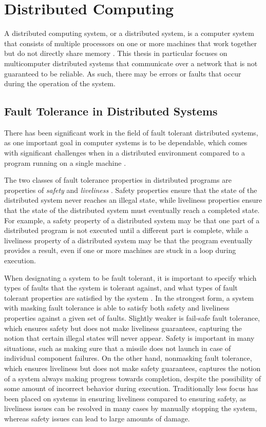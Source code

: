 \documentclass[twoside]{report}
\begin{document}
\section{Distributed Computing}

A distributed computing system, or a distributed system, is a computer system that consists of multiple processors on one or more machines that work together but do not directly share memory \cite{10.1145/72551.72552}.
This thesis in particular focuses on multicomputer distributed systems that communicate over a network that is not guaranteed to be reliable.
As such, there may be errors or faults that occur during the operation of the system.

\subsection{Fault Tolerance in Distributed Systems}
There has been significant work in the field of fault tolerant distributed systems, as one important goal in computer systems is to be dependable, which comes with significant challenges when in a distributed environment compared to a program running on a single machine \cite{10.1145/311531.311532}.

The two classes of fault tolerance properties in distributed programs are properties of \textit{safety} and \textit{liveliness} \cite{1702415}.
Safety properties ensure that the state of the distributed system never reaches an illegal state, while liveliness properties ensure that the state of the distributed system must eventually reach a completed state.
For example, a safety property of a distributed system may be that one part of a distributed program is not executed until a different part is complete, while a liveliness property of a distributed system may be that the program eventually provides a result, even if one or more machines are stuck in a loop during execution.

When designating a system to be fault tolerant, it is important to specify which types of faults that the system is tolerant against, and what types of fault tolerant properties are satisfied by the system \cite{10.1145/311531.311532}.
In the strongest form, a system with masking fault tolerance is able to satisfy both safety and liveliness properties against a given set of faults.
Slightly weaker is fail-safe fault tolerance, which ensures safety but does not make liveliness guarantees, capturing the notion that certain illegal states will never appear.
Safety is important in many situations, such as making sure that a missile does not launch in case of individual component failures.
On the other hand, nonmasking fault tolerance, which ensures liveliness but does not make safety guarantees, captures the notion of a system always making progress towards completion, despite the possibility of some amount of incorrect behavior during execution.
Traditionally less focus has been placed on systems in ensuring liveliness compared to ensuring safety, as liveliness issues can be resolved in many cases by manually stopping the system, whereas safety issues can lead to large amounts of damage.
\end{document}
